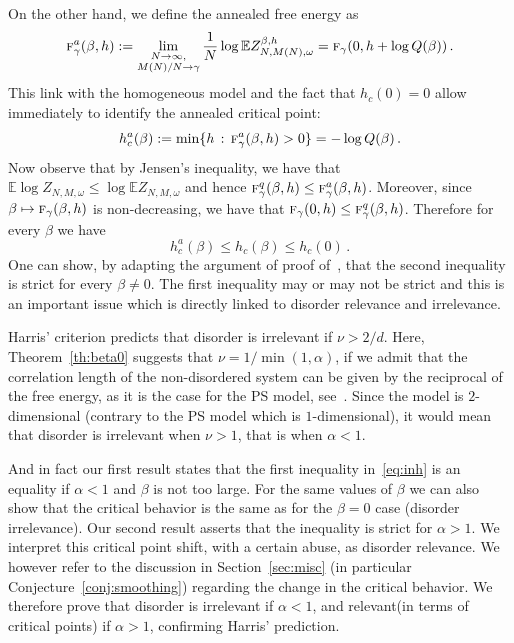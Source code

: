 \documentclass[10pt]{amsart}
\theoremstyle{definition}\newtheorem{defi}[theo]{Definition}\newtheorem{rema}[theo]{Remark}\newtheorem{exam}[theo]{Example}\newtheorem{exem}[theo]{Example}\newtheorem{nota}[theo]{Notation}
\newcommand{\ga}{\alpha}
\newcommand{\gb}{\beta}
\newcommand{\tf}{\textsc{f}} %
\newcommand{\bbE}{\ensuremath{\mathbb{E}}}
\newcommand{\limtwo}[2]{\lim_{\substack{#1 \\ #2}}}
\begin{document}
On the other hand, we define the annealed free energy as
\begin{equation}
\tf_\gamma^{a}(\beta,h) := \limtwo{N\to\infty,}{M(N) / N \to \gamma} \frac{1}{N} \log \bbE Z_{N,M(N),\omega}^{\gb,h} = \tf_\gamma (0, h + \log Q(\beta))\,.
\end{equation}
This link with the homogeneous model and the fact that $h_c(0)=0$ allow immediately to identify the annealed critical point:
\begin{equation}\label{eq:hann}
h_c^{a}(\beta) := \min \lbrace h\,:\,\tf^{a}_\gamma (\beta,h) >0 \rbrace = - \log Q(\beta)\,.
\end{equation}
Now observe that by Jensen's inequality, we have that $\bbE \log Z_{N,M,\omega} \le \log \bbE Z_{N,M,\omega}$ and hence $\tf_\gamma^{q}(\beta,h) \le \tf_\gamma^{a}(\beta,h)$. Moreover, since $\beta \mapsto \tf_\gamma (\beta,h)$ is non-decreasing, we have that $\tf_\gamma (0,h) \le \tf^{q}_\gamma (\beta,h) $. Therefore for every $\beta$ we have
\begin{equation}\label{eq:inh}
h_c^{a}(\beta)\le h_c(\beta) \le h_c(0)\,.
\end{equation}
One can show, by adapting the argument of proof of~\cite[Theorem~5.2]{cf:G}, that the second inequality is strict for every $\gb \neq 0$. The first inequality may or may not be strict and this is an important issue which is directly linked to disorder relevance and irrelevance.


Harris' criterion predicts that disorder is irrelevant if $\nu>2/d$. Here, Theorem~\ref{th:beta0} suggests that $\nu=1/\min(1,\alpha)$, if we admit that the correlation length of the non-disordered system can be given by the reciprocal of the free energy, as it is the case for the PS model, see~\cite{cf:G08}. Since the model is $2$-dimensional (contrary to the PS model which is $1$-dimensional), it would mean that disorder is irrelevant when $\nu>1$, that is when $\ga<1$.



And in fact our first result states that the first inequality in~\eqref{eq:inh} is an equality if $\ga<1$ and $\gb$ is not too large. For the same values of $\gb$ we can also show that the critical behavior is the same as for the $\gb=0$ case (disorder irrelevance). Our second result asserts that the inequality is strict for $\ga>1$. We interpret this critical point shift, with a certain abuse, as disorder relevance. We however refer to the discussion in Section~\ref{sec:misc} (in particular Conjecture~\ref{conj:smoothing}) regarding the change in the critical behavior. We therefore prove that disorder is irrelevant if $\ga<1$, and relevant\linebreak(in terms of critical points) if $\ga>1$, confirming Harris' prediction.
\end{document}
